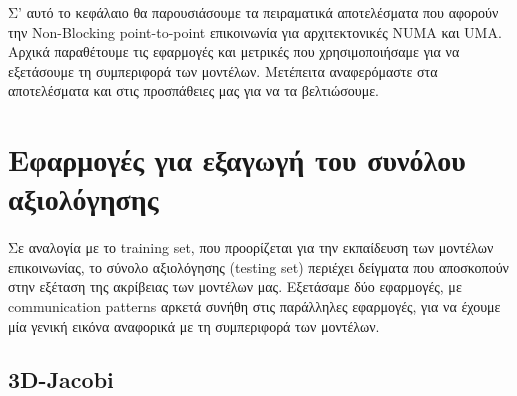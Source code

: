 Σ' αυτό το κεφάλαιο θα παρουσιάσουμε τα πειραματικά αποτελέσματα που αφορούν την Non-Blocking point-to-point επικοινωνία για αρχιτεκτονικές NUMA και UMA. Αρχικά παραθέτουμε τις εφαρμογές και μετρικές που χρησιμοποιήσαμε για να εξετάσουμε τη συμπεριφορά των μοντέλων. Μετέπειτα αναφερόμαστε στα αποτελέσματα και στις προσπάθειες μας για να τα βελτιώσουμε.

\section{Εφαρμογές για εξαγωγή του συνόλου αξιολόγησης}
\paragraph{}
Σε αναλογία με το training set, που προορίζεται για την εκπαίδευση των μοντέλων επικοινωνίας, το σύνολο αξιολόγησης (testing set) περιέχει δείγματα που αποσκοπούν στην εξέταση της ακρίβειας των μοντέλων μας. Εξετάσαμε δύο εφαρμογές, με communication patterns αρκετά συνήθη στις παράλληλες εφαρμογές, για να έχουμε μία γενική εικόνα αναφορικά με τη συμπεριφορά των μοντέλων.
\subsection{3D-Jacobi}
